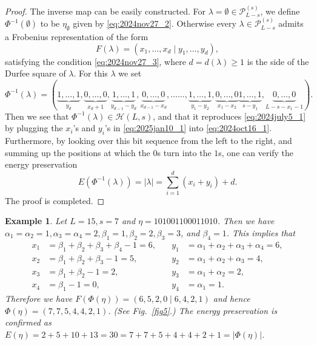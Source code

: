 \documentclass[sn-mathphys-num]{sn-jnl}%
\theoremstyle{thmstyleone}%
\theoremstyle{thmstyletwo}%
\newtheorem{example}{Example}%
\theoremstyle{thmstylethree}%
\begin{document}
\begin{proof}
The inverse map can be easily constructed.
For $\lambda = \emptyset \in \mathscr{P}^{(s)}_{L-s}$, we define $\Phi^{-1}(\emptyset)$ 
to be $\eta_{\emptyset}$ given by \eqref{eq:2024nov27_2}.
Otherwise every $\lambda \in \mathscr{P}^{(s)}_{L-s}$ admits a Frobenius representation
of the form 
\begin{equation}\label{eq:2024dec5_1}
F(\lambda) = (x_1,\dots,x_d \mid y_1, \dots, y_d),
\end{equation}
satisfying the condition
\eqref{eq:2024nov27_3}, where $d = d(\lambda) \geq 1$ is the side of the Durfee square of $\lambda$.
For this $\lambda$ we set
\begin{equation}\label{eq:2024oct16_1}
\Phi^{-1}(\lambda)  =(\underbrace{1,\dots,1}_{y_d}, \underbrace{0, \dots, 0}_{x_d+1},
\underbrace{1,\dots,1}_{y_{d-1}-y_d}, \underbrace{0, \dots, 0}_{x_{d-1}-x_d},\dots \dots,\underbrace{1,\dots,1}_{y_{1}-y_2}, \underbrace{0, \dots, 0}_{x_{1}-x_2}
\underbrace{1,\dots,1}_{s-y_1}, \underbrace{0, \dots, 0}_{L-s-x_1-1}).
\end{equation}
Then we see that $\Phi^{-1}(\lambda) \in \mathcal{H}(L,s)$, and
that it reproduces \eqref{eq:2024july5_1} by plugging the $x_i$'s and $y_i$'s in \eqref{eq:2025jan10_1}
into \eqref{eq:2024oct16_1}.
Furthermore, by looking over this bit sequence from the left to the right,
and summing up the positions at which the $0$s turn into the $1$s, 
one can verify the energy preservation
\begin{equation*}
E(\Phi^{-1}(\lambda)) = |\lambda| = \sum_{i=1}^d (x_i + y_i) + d.
\end{equation*}
The proof is completed.
\end{proof}

\begin{example}
Let $L=15, s=7$ and $\eta = 101001100011010$.
Then we have $\alpha_1 = \alpha_2= 1, \alpha_3 = \alpha_4 = 2, \beta_1 = 1, \beta_2=2, \beta_3=3$,
and $\beta_4=1$.
This implies that
\begin{align*}
x_1 &= \beta_1 + \beta_2 + \beta_3 + \beta_4 - 1 = 6, &\quad
y_1 &= \alpha_1 + \alpha_2 + \alpha_3 + \alpha_4 = 6, \\
x_2 &= \beta_1 + \beta_2 + \beta_3 - 1 = 5, &\quad
y_2 &= \alpha_1 + \alpha_2 + \alpha_3 = 4, \\
x_3 &= \beta_1 + \beta_2 - 1 = 2, &\quad
y_3 &= \alpha_1 + \alpha_2  = 2, \\
x_4 &= \beta_1  - 1 = 0, &\quad
y_4 &= \alpha_1   = 1.
\end{align*}
Therefore we have $F(\Phi (\eta)) = (6,5,2,0 \mid 6,4,2,1)$ and hence
$\Phi (\eta) = (7,7,5,4,4,2,1)$.
(See Fig.~\ref{fig5}.)
The energy preservation is confirmed as $E(\eta) = 2+5+10+13 = 30 = 7+7+5+4+4+2+1 =|\Phi (\eta)|$.




\end{example}
\end{document}
